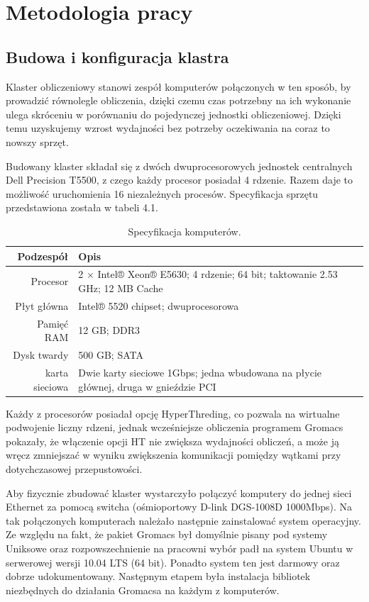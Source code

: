\chapter{Metodologia pracy}
\section{Budowa i konfiguracja klastra}

Klaster obliczeniowy stanowi zespół komputerów połączonych w ten sposób, by prowadzić równolegle obliczenia, dzięki czemu czas potrzebny na ich wykonanie ulega skróceniu w porównaniu do pojedynczej jednostki obliczeniowej. Dzięki temu uzyskujemy wzrost wydajności bez potrzeby oczekiwania na coraz to nowszy sprzęt.

Budowany klaster składał się z dwóch dwuprocesorowych jednostek centralnych Dell Precision T5500, z czego każdy procesor posiadał 4 rdzenie. Razem daje to możliwość uruchomienia 16 niezależnych procesów. Specyfikacja sprzętu przedstawiona została w tabeli 4.1.

\begin{table}[ht!]
\centering
  \begin{tabular}{| r | p{10cm} |}
  \hline
  Podzespół & Opis \\
  \hline
 Procesor &  2 $\times$ Intel® Xeon® E5630; 4 rdzenie; 64 bit; taktowanie 2.53 GHz; 12 MB Cache \\
 Płyt główna & Intel® 5520 chipset; dwuprocesorowa\\
 Pamięć RAM & 12 GB; DDR3\\
 Dysk twardy & 500 GB; SATA\\
 karta sieciowa & Dwie karty sieciowe 1Gbps; jedna wbudowana na płycie głównej, druga w gnieździe PCI\\
 \hline  
  \end{tabular}
  \caption{Specyfikacja komputerów.}
\end{table}
Każdy z procesorów posiadał opcję HyperThreding, co pozwala na wirtualne podwojenie liczny rdzeni, jednak wcześniejsze obliczenia programem Gromacs pokazały, że włączenie opcji HT nie zwiększa wydajności obliczeń, a może ją wręcz zmniejszać w wyniku zwiększenia komunikacji pomiędzy wątkami przy dotychczasowej przepustowości.

Aby fizycznie zbudować klaster wystarczyło połączyć komputery do jednej sieci Ethernet za pomocą switcha (ośmioportowy D-link DGS-1008D 1000Mbps). Na tak połączonych komputerach należało następnie zainstalować system operacyjny. Ze względu na fakt, że pakiet Gromacs był domyślnie pisany pod systemy Uniksowe oraz rozpowszechnienie na pracowni wybór padł na system Ubuntu w serwerowej wersji 10.04 LTS (64 bit). Ponadto system ten jest darmowy oraz dobrze udokumentowany. Następnym etapem była instalacja bibliotek niezbędnych do działania Gromacsa na każdym z komputerów.

